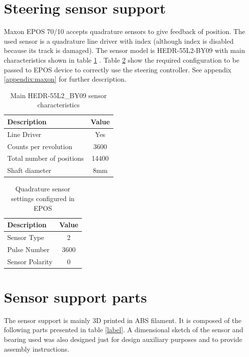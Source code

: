 \section{Steering sensor support}
Maxon EPOS 70/10 accepts quadrature sensors to give feedback of position. The used sensor is a quadrature line driver with index (although index is disabled because its track is damaged). The sensor model is HEDR-55L2-BY09 with main characteristics shown in table \ref{tab:quad_sensor} \cite{hedr_sensor}. Table \ref{tab:quad_sensor_settings} show the required configuration to be passed to EPOS device to correctly use the steering controller. See appendix \ref{appendix:maxon} for further description.
\begin{table}[!hb]
	\centering
	\begin{tabular}{lc}
		\toprule
		\textbf{Description} & \textbf{Value}\\
		\midrule
		Line Driver & Yes\\
		Counts per revolution & 3600\\
		Total number of positions & 14400\\
		Shaft diameter & 8mm\\
		\bottomrule
	\end{tabular}
	\caption{Main HEDR-55L2\_BY09 sensor characteristics}
	\label{tab:quad_sensor}
\end{table}

\begin{table}[!hb]
	\centering
	\begin{tabular}{lc}
		\toprule
		\textbf{Description} & \textbf{Value}\\
		\midrule
		Sensor Type & 2\\
		Pulse Number & 3600\\
		Sensor Polarity & 0\\
		\bottomrule
	\end{tabular}
	\caption{Quadrature sensor settings configured in EPOS}
	\label{tab:quad_sensor_settings}
\end{table}

\section{Sensor support parts}
The sensor support is mainly 3D printed in ABS filament. It is composed of the following parts presented in table \ref{label}.
A dimensional sketch of the sensor and bearing used was also designed just for design auxiliary purposes and to provide assembly instructions.

